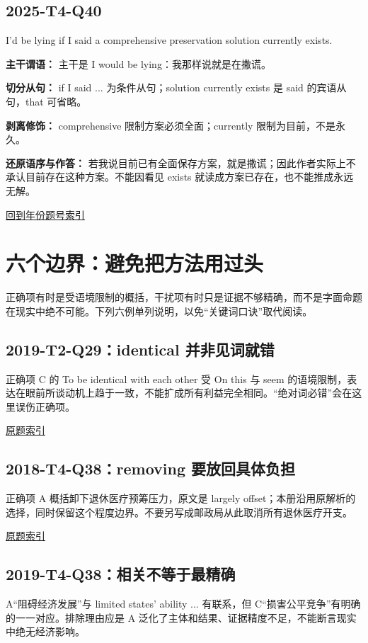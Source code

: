 \documentclass[11pt,a4paper]{article}
\begin{document}
\subsection{2025-T4-Q40}
\begin{evidence}I’d be lying if I said a comprehensive preservation solution currently exists.\end{evidence}
\noindent\textbf{主干谓语：} 主干是 I would be lying：我那样说就是在撒谎。\par\smallskip
\noindent\textbf{切分从句：} if I said ... 为条件从句；solution currently exists 是 said 的宾语从句，that 可省略。\par\smallskip
\noindent\textbf{剥离修饰：} comprehensive 限制方案必须全面；currently 限制为目前，不是永久。\par\smallskip
\noindent\textbf{还原语序与作答：} 若我说目前已有全面保存方案，就是撒谎；因此作者实际上不承认目前存在这种方案。不能因看见 exists 就读成方案已存在，也不能推成永远无解。\par\smallskip
\hyperref[idx-2025-T4-Q40]{回到年份题号索引}\par
\clearpage\section{六个边界：避免把方法用过头}\label{boundaries}
正确项有时是受语境限制的概括，干扰项有时只是证据不够精确，而不是字面命题在现实中绝不可能。下列六例单列说明，以免“关键词口诀”取代阅读。

\subsection{2019-T2-Q29：identical 并非见词就错}
正确项 C 的 To be identical with each other 受 On this 与 seem 的语境限制，表达在眼前所谈动机上趋于一致，不能扩成所有利益完全相同。“绝对词必错”会在这里误伤正确项。

\hyperref[idx-2019-T2-Q29]{原题索引}\par
{}
\subsection{2018-T4-Q38：removing 要放回具体负担}
正确项 A 概括卸下退休医疗预筹压力，原文是 largely offset；本册沿用原解析的选择，同时保留这个程度边界。不要另写成邮政局从此取消所有退休医疗开支。

\hyperref[idx-2018-T4-Q38]{原题索引}\par
{}
\subsection{2019-T4-Q38：相关不等于最精确}
A“阻碍经济发展”与 limited states’ ability ... 有联系，但 C“损害公平竞争”有明确的一一对应。排除理由应是 A 泛化了主体和结果、证据精度不足，不能断言现实中绝无经济影响。
\end{document}
